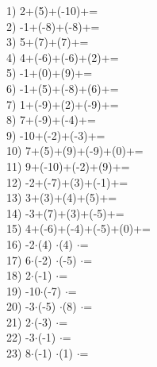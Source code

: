 \documentclass[a4paper,10pt]{article}
\begin{document}
1)   2+(5)+(-10)+=
\vspace{0.5cm}\\2)   -1+(-8)+(-8)+=
\vspace{0.5cm}\\3)   5+(7)+(7)+=
\vspace{0.5cm}\\4)   4+(-6)+(-6)+(2)+=
\vspace{0.5cm}\\5)   -1+(0)+(9)+=
\vspace{0.5cm}\\6)   -1+(5)+(-8)+(6)+=
\vspace{0.5cm}\\7)   1+(-9)+(2)+(-9)+=
\vspace{0.5cm}\\8)   7+(-9)+(-4)+=
\vspace{0.5cm}\\9)   -10+(-2)+(-3)+=
\vspace{0.5cm}\\10)   7+(5)+(9)+(-9)+(0)+=
\vspace{0.5cm}\\11)   9+(-10)+(-2)+(9)+=
\vspace{0.5cm}\\12)   -2+(-7)+(3)+(-1)+=
\vspace{0.5cm}\\13)   3+(3)+(4)+(5)+=
\vspace{0.5cm}\\14)   -3+(7)+(3)+(-5)+=
\vspace{0.5cm}\\15)   4+(-6)+(-4)+(-5)+(0)+=
\vspace{0.5cm}\\16)   -2$\cdot$(4) $\cdot$(4) $\cdot$=
\vspace{0.5cm}\\17)   6$\cdot$(-2) $\cdot$(-5) $\cdot$=
\vspace{0.5cm}\\18)   2$\cdot$(-1) $\cdot$=
\vspace{0.5cm}\\19)   -10$\cdot$(-7) $\cdot$=
\vspace{0.5cm}\\20)   -3$\cdot$(-5) $\cdot$(8) $\cdot$=
\vspace{0.5cm}\\21)   2$\cdot$(-3) $\cdot$=
\vspace{0.5cm}\\22)   -3$\cdot$(-1) $\cdot$=
\vspace{0.5cm}\\23)   8$\cdot$(-1) $\cdot$(1) $\cdot$=
\end{document}
